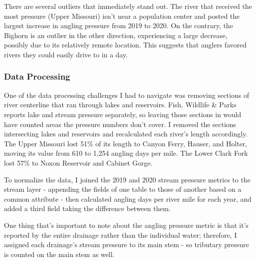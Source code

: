 \documentclass[11pt]{article}
\begin{document}
There are several outliers that immediately stand out. The river that
received the most pressure (Upper Missouri) isn't near a population
center and posted the largest increase in angling pressure from 2019 to
2020. On the contrary, the Bighorn is an outlier in the other direction,
experiencing a large decrease, possibly due to its relatively remote
location. This suggests that anglers favored rivers they could easily
drive to in a day.

\hypertarget{data-processing}{%
\subsubsection{Data Processing}\label{data-processing}}

One of the data processing challenges I had to navigate was removing
sections of river centerline that ran through lakes and reservoirs.
Fish, Wildlife \& Parks reports lake and stream pressure separately, so
leaving those sections in would have counted areas the pressure numbers
don't cover. I removed the sections intersecting lakes and reservoirs
and recalculated each river's length accordingly. The Upper Missouri
lost 51\% of its length to Canyon Ferry, Hauser, and Holter, moving its
value from 610 to 1,254 angling days per mile. The Lower Clark Fork lost
57\% to Noxon Reservoir and Cabinet Gorge.

To normalize the data, I joined the 2019 and 2020 stream pressure
metrics to the stream layer - appending the fields of one table to those
of another based on a common attribute - then calculated angling days
per river mile for each year, and added a third field taking the
difference between them.

One thing that's important to note about the angling pressure metric is
that it's reported by the entire drainage rather than the individual
water; therefore, I assigned each drainage's stream pressure to its main
stem - so tributary pressure is counted on the main stem as well.
\end{document}
